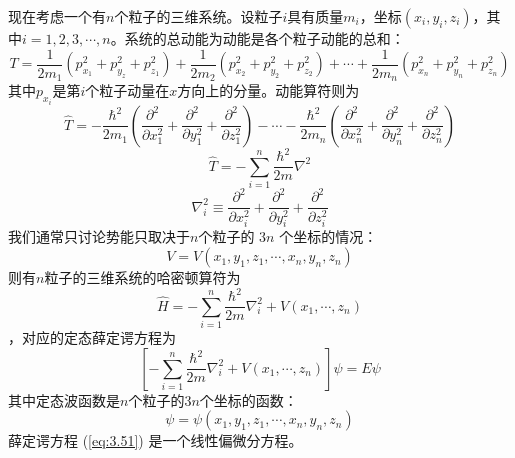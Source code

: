 	现在考虑一个有$n$个粒子的三维系统。设粒子$i$具有质量$m_i$，坐标$\left(x_i,y_i,z_i\right)$，其中$i = 1,2,3,\cdots,n$。系统的总动能为动能是各个粒子动能的总和：
	\begin{equation*}
		T = \frac{1}{2m_1}\left(p_{x_1}^2+p_{y_z}^2+p_{z_1}^2\right) + \frac{1}{2m_2}\left(p_{x_2}^2+p_{y_2}^2+p_{z_2}^2\right) + \cdots + \frac{1}{2m_n}\left(p_{x_n}^2+p_{y_n}^2+p_{z_n}^2\right)
	\end{equation*}
	其中$p_{x_i}$是第$i$个粒子动量在$x$方向上的分量。动能算符则为
	\begin{equation*}
		\hat{T} = -\frac{\hbar^2}{2m_1}\left(\frac{\partial^2}{\partial x_1^2}+\frac{\partial^2}{\partial y_1^2}+\frac{\partial^2}{\partial z_1^2}\right) - \cdots - \frac{\hbar^2}{2m_n}\left(\frac{\partial^2}{\partial x_n^2}+\frac{\partial^2}{\partial y_n^2}+\frac{\partial^2}{\partial z_n^2}\right)
	\end{equation*}
	\begin{equation}
		\boxed{
			\hat{T} = - \sum_{i=1}^{n}\frac{\hbar^2}{2m}\nabla^2
		}
		\label{eq:3.48}
	\end{equation}
	\begin{equation}
		\boxed{
			\nabla_i^2 \equiv \frac{\partial^2}{\partial x_i^2} + \frac{\partial^2}{\partial y_i^2} + \frac{\partial^2}{\partial z_i^2}
		}
		\label{eq:3.49}
	\end{equation}
	我们通常只讨论势能只取决于$n$个粒子的 $3n$ 个坐标的情况：
	\begin{equation*}
		V = V\left(x_1,y_1,z_1,\cdots, x_n,y_n,z_n\right)
	\end{equation*}
	则有$n$粒子的三维系统的哈密顿算符为
	\begin{equation}
		\boxed{
			\hat{H} = -\sum_{i=1}^{n}\frac{\hbar^2}{2m}\nabla_i^2+V\left(x_1,\cdots,z_n\right)
		}
		\label{eq:3.50}
	\end{equation}
	，对应的定态薛定谔方程为
	\begin{equation}
		\left[-\sum_{i=1}^{n}\frac{\hbar^2}{2m}\nabla_i^2+V\left(x_1,\cdots,z_n\right)\right]\psi = E\psi
		\label{eq:3.51}
	\end{equation}
	其中定态波函数是$n$个粒子的$3n$个坐标的函数：
	\begin{equation}
		\psi = \psi\left(x_1,y_1,z_1,\cdots,x_n,y_n,z_n\right)
		\label{eq:3.52}
	\end{equation}
	薛定谔方程 (\ref{eq:3.51}) 是一个线性偏微分方程。

